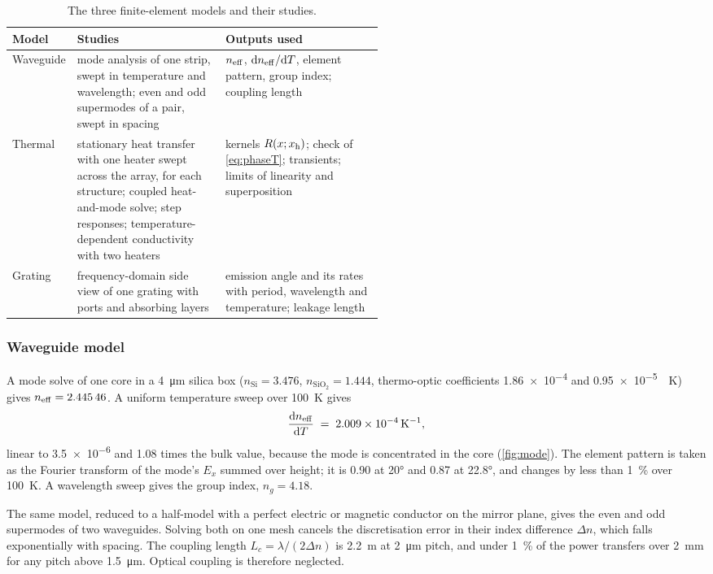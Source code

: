 \begin{table}[htbp]
  \centering
  \caption{The three finite-element models and their studies.}
  \label{tab:models}
  \small
  \begin{tabularx}{\linewidth}{@{}P{0.13\linewidth}P{0.4\linewidth}L@{}}
    \toprule
    Model & Studies & Outputs used \\
    \midrule
    Waveguide & mode analysis of one strip, swept in temperature and wavelength; even and odd supermodes of a
        pair, swept in spacing & $n_{\mathrm{eff}}$, $\mathrm{d}n_{\mathrm{eff}}/\mathrm{d}T$, element pattern, group index; coupling length \\
    Thermal & stationary heat transfer with one heater swept across the array, for each structure; coupled
        heat-and-mode solve; step responses; temperature-dependent conductivity with two heaters & kernels
        $R(x;x_{\mathrm{h}})$; check of \cref{eq:phaseT}; transients; limits of linearity and superposition \\
    Grating & frequency-domain side view of one grating with ports and absorbing layers & emission angle and its
        rates with period, wavelength and temperature; leakage length \\
    \bottomrule
  \end{tabularx}
\end{table}

\subsubsection{Waveguide model}
\label{sec:modelA}

A mode solve of one core in a \qty{4}{\micro\metre} silica box ($n_\mathrm{Si}=3.476$, $n_\mathrm{SiO_2}=1.444$,
thermo-optic coefficients \qty{1.86e-4}{} and \qty{0.95e-5}{\per\kelvin}) gives $n_{\mathrm{eff}}=\num{2.44546}$. A uniform
temperature sweep over \qty{100}{\kelvin} gives
\begin{equation}
  \frac{\mathrm{d}n_{\mathrm{eff}}}{\mathrm{d} T} \;=\; \qty{2.009e-4}{\per\kelvin},
\end{equation}
linear to \num{3.5e-6} and \num{1.08} times the bulk value, because the mode is concentrated in the core
(\cref{fig:mode}). The element pattern is taken as the Fourier transform of the mode's $E_x$ summed over height; it
is \num{0.90} at \ang{20} and \num{0.87} at \ang{22.8}, and changes by less than \qty{1}{\percent} over
\qty{100}{\kelvin}. A wavelength sweep gives the group index, $n_g=4.18$.

The same model, reduced to a half-model with a perfect electric or magnetic conductor on the mirror plane, gives the
even and odd supermodes of two waveguides. Solving both on one mesh cancels the discretisation error in their
index difference $\Delta n$, which falls exponentially with spacing. The coupling length $L_c=\lambda/(2\Delta n)$
is \qty{2.2}{\metre} at \qty{2}{\micro\metre} pitch, and under \qty{1}{\percent} of the power transfers over
\qty{2}{\milli\metre} for any pitch above \qty{1.5}{\micro\metre}. Optical coupling is therefore
neglected.

